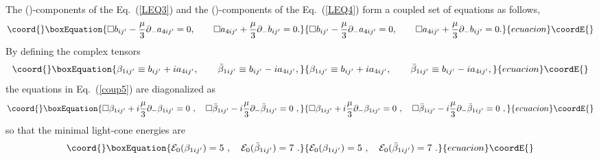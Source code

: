 \documentclass[a4paper,12pt]{article}
\numberwithin{equation}{section}
\begin{document}
The (\coordHE{})-components of the Eq.~(\ref{LEQ3}) and the
(\coordHE{})-components of the Eq.~(\ref{LEQ4}) form a coupled set of
equations as follows,
\begin{equation}\coord{}\boxEquation{\label{coup5}
\Box b_{ij'} - \frac{\mu}3 \partial_- a_{4ij'} = 0, \qquad \Box
a_{4ij'} + \frac{\mu}3\partial_- b_{ij'} = 0.
}{\Box b_{ij'} - \frac{\mu}3 \partial_- a_{4ij'} = 0, \qquad \Box
a_{4ij'} + \frac{\mu}3\partial_- b_{ij'} = 0.
}{ecuacion}\coordE{}\end{equation}
By defining the complex tensors
\begin{equation}\coord{}\boxEquation{\label{mod5}
\beta_{1ij'} \equiv b_{ij'} + i a_{4ij'}, \qquad \bar\beta_{1ij'}
\equiv b_{ij'} - i a_{4ij'},
}{\beta_{1ij'} \equiv b_{ij'} + i a_{4ij'}, \qquad \bar\beta_{1ij'}
\equiv b_{ij'} - i a_{4ij'},
}{ecuacion}\coordE{}\end{equation}
the equations in Eq.~(\ref{coup5}) are diagonalized as
\begin{equation}\coord{}\boxEquation{\label{dia5}
\Box \beta_{1ij'}
   + i \frac{\mu}{3} \partial_- \beta_{1ij'} = 0 ~,~~~
\Box \bar\beta_{1ij'}
   - i \frac{\mu}{3} \partial_- \bar\beta_{1ij'} = 0 ~,
}{\Box \beta_{1ij'}
   + i \frac{\mu}{3} \partial_- \beta_{1ij'} = 0 ~,~~~
\Box \bar\beta_{1ij'}
   - i \frac{\mu}{3} \partial_- \bar\beta_{1ij'} = 0 ~,
}{ecuacion}\coordE{}\end{equation}
so that the minimal light-cone energies are
\begin{equation}\coord{}\boxEquation{\label{eng5}
{\cal E}_0(\beta_{1ij'}) = 5 ~,~~~
{\cal E}_0(\bar\beta_{1ij'}) = 7 ~.
}{{\cal E}_0(\beta_{1ij'}) = 5 ~,~~~
{\cal E}_0(\bar\beta_{1ij'}) = 7 ~.
}{ecuacion}\coordE{}\end{equation}
\end{document}
